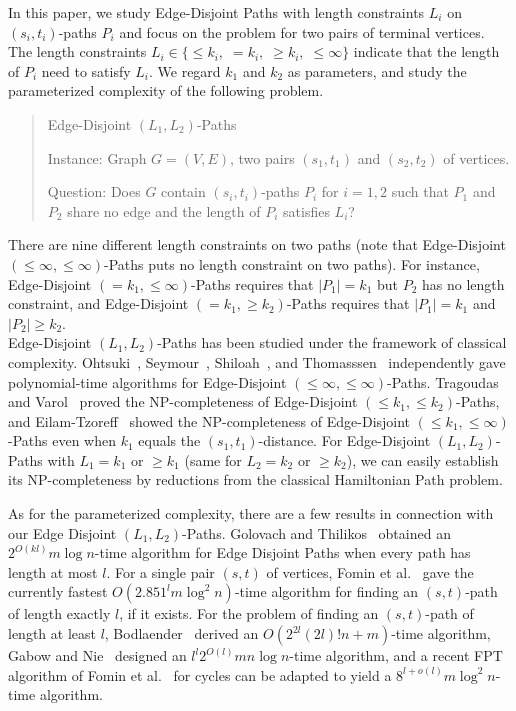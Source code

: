 \documentclass{llncs}
\begin{document}
In this paper, we study {\sc Edge-Disjoint Paths} with length constraints $L_i$ on 
$(s_i,t_i)$-paths $P_i$ and focus on the problem for two pairs of terminal vertices.
The length constraints $L_i \in \{ \le k_i, \; = k_i, \; \ge k_i, \; \le \infty\}$ indicate
that the length of $P_i$ need to satisfy $L_i$.
We regard $k_1$ and $k_2$ as parameters, and study the parameterized complexity 
of the following problem.

\begin{quote}
	{\sc Edge-Disjoint $(L_1,L_2)$-Paths}
	
	{\sc Instance}: Graph $G = (V,E)$, two pairs $(s_1,t_1)$ and $(s_2,t_2)$ of vertices.
	
	{\sc Question}: Does $G$ contain $(s_i,t_i)$-paths $P_i$ for $i = 1,2$ 
	such that $P_1$ and $P_2$ share no edge and the length of $P_i$ satisfies $L_i$?
\end{quote}

There are nine different length constraints on two paths 
(note that {\sc Edge-Disjoint $(\le \infty, \le \infty)$-Paths} puts no length constraint on two paths). 
For instance, {\sc Edge-Disjoint $(= k_1, \le \infty)$-Paths}
requires that $|P_1| = k_1$ but $P_2$ has no length constraint,
and {\sc Edge-Disjoint $(= k_1, \ge k_2)$-Paths} requires that $|P_1| = k_1$ and $|P_2| \ge k_2$. \\

 {\sc Edge-Disjoint $(L_1,L_2)$-Paths} has been studied 
under the framework of classical complexity. 
Ohtsuki~\cite{ohtsuki1980two}, Seymour~\cite{seymour1980disjoint}, 
Shiloah~\cite{shiloach1980polynomial}, and Thomasssen~\cite{thomassen19802} independently 
gave polynomial-time algorithms for {\sc Edge-Disjoint $(\le \infty, \le \infty)$-Paths}.
Tragoudas and Varol~\cite{tragoudas1997computing} proved the NP-completeness of
{\sc Edge-Disjoint $(\le k_1, \le k_2)$-Paths},
and Eilam-Tzoreff~\cite{eilam1998disjoint} showed the NP-completeness of
{\sc Edge-Disjoint $(\le k_1, \le \infty)$-Paths} even when $k_1$ equals the $(s_1,t_1)$-distance.
For {\sc Edge-Disjoint $(L_1,L_2)$-Paths} with $L_1 = k_1$ or $\ge k_1$ 
(same for $L_2 = k_2$ or $\ge k_2$), we can easily establish its NP-completeness by 
reductions from the classical {\sc Hamiltonian Path} problem.

As for the parameterized complexity, there are a few results in connection with our
{\sc Edge Disjoint $(L_1,L_2)$-Paths}.
Golovach and Thilikos~\cite{golovach2011paths} obtained an $2^{O(kl)}m \log n$-time
algorithm
for {\sc Edge Disjoint Paths} when every path has length at most $l$.
For a single pair $(s,t)$ of vertices, Fomin et al.~\cite{fomin2014efficient}
gave the currently fastest $O(2.851^l m \log^2 n)$-time algorithm for finding
an $(s,t)$-path of length exactly $l$, if it exists.
For the problem of finding an $(s,t)$-path of length at least $l$,
Bodlaender~\cite{bodlaender1993linear} derived an $O(2^{2l} (2l)!n + m)$-time algorithm,
Gabow and Nie~\cite{gabow2008finding} designed an $l^l 2^{O(l)}mn\log n$-time algorithm,
and a recent FPT algorithm of Fomin et al.~\cite{fomin2014efficient} for cycles
can be adapted to yield a $8^{l + o(l)} m\log ^2 n$-time algorithm. \\
\end{document}

